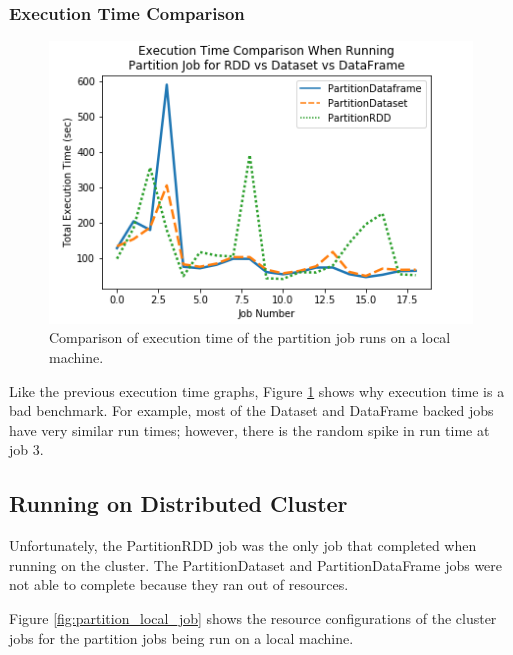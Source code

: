 \documentclass[conference]{IEEEtran}
\begin{document}
\subsubsection{Execution Time Comparison}
\begin{figure}
    \includegraphics[width=\linewidth]{../python_scripts/images/partitionJobAllExecutionTime.png}
    \caption{Comparison of execution time of the partition job runs on a local machine.}
    \label{fig:partitionJobAllExecutionTime}
\end{figure}

Like the previous execution time graphs, Figure \ref{fig:partitionJobAllExecutionTime} shows why execution time is a bad benchmark.
For example, most of the Dataset and DataFrame backed jobs have very similar run times; however, there is the random spike in run time at job 3.

\subsection{Running on Distributed Cluster}

Unfortunately, the PartitionRDD job was the only job that completed when running on the cluster.
The PartitionDataset and PartitionDataFrame jobs were not able to complete because they ran out of resources.

Figure \ref{fig:partition_local_job} shows the resource configurations of the cluster jobs for the partition jobs being run on a local machine.
\end{document}
